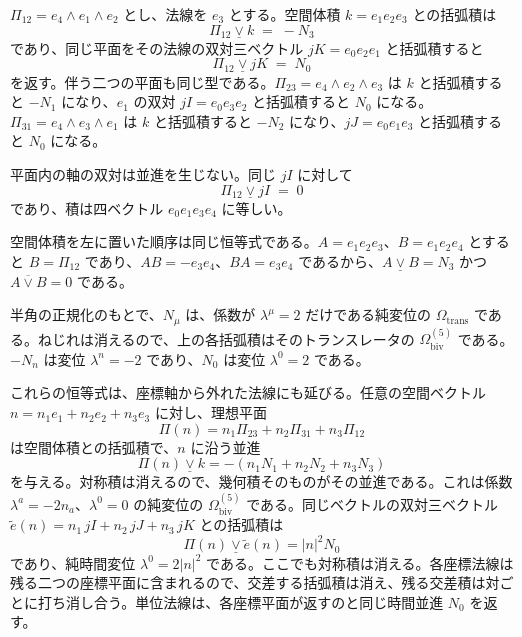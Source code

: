 \documentclass[a4paper]{article}
\begin{document}
\(\Pi_{12}=e_{4}\wedge e_{1}\wedge e_{2}\) とし、法線を \(e_{3}\) とする。空間体積 \(k=e_{1}e_{2}e_{3}\) との括弧積は
\[
\Pi_{12}\mathbin{\underline{\vee}} k \;=\; -N_{3}
\]
であり、同じ平面をその法線の双対三ベクトル \(jK=e_{0}e_{2}e_{1}\) と括弧積すると
\[
\Pi_{12}\mathbin{\underline{\vee}} jK \;=\; N_{0}
\]
を返す。伴う二つの平面も同じ型である。\(\Pi_{23}=e_{4}\wedge e_{2}\wedge e_{3}\) は \(k\) と括弧積すると \(-N_{1}\) になり、\(e_{1}\) の双対 \(jI=e_{0}e_{3}e_{2}\) と括弧積すると \(N_{0}\) になる。\(\Pi_{31}=e_{4}\wedge e_{3}\wedge e_{1}\) は \(k\) と括弧積すると \(-N_{2}\) になり、\(jJ=e_{0}e_{1}e_{3}\) と括弧積すると \(N_{0}\) になる。

平面内の軸の双対は並進を生じない。同じ \(jI\) に対して
\[
\Pi_{12}\mathbin{\underline{\vee}} jI \;=\; 0
\]
であり、積は四ベクトル \(e_{0}e_{1}e_{3}e_{4}\) に等しい。

空間体積を左に置いた順序は同じ恒等式である。\(A=e_{1}e_{2}e_{3}\)、\(B=e_{1}e_{2}e_{4}\) とすると \(B=\Pi_{12}\) であり、\(AB=-e_{3}e_{4}\)、\(BA=e_{3}e_{4}\) であるから、\(A\mathbin{\underline{\vee}}B=N_{3}\) かつ \(A\mathbin{\overline{\vee}}B=0\) である。

半角の正規化のもとで、\(N_{\mu}\) は、係数が \(\lambda^{\mu}=2\) だけである純変位の \(\Omega_{\mathrm{trans}}\) である。ねじれは消えるので、上の各括弧積はそのトランスレータの \(\Omega_{\mathrm{biv}}^{(5)}\) である。\(-N_{n}\) は変位 \(\lambda^{n}=-2\) であり、\(N_{0}\) は変位 \(\lambda^{0}=2\) である。

これらの恒等式は、座標軸から外れた法線にも延びる。任意の空間ベクトル \(n=n_{1}e_{1}+n_{2}e_{2}+n_{3}e_{3}\) に対し、理想平面
\begin{equation}
\label{eq:plane-off-axis}
\Pi(n)=n_{1}\Pi_{23}+n_{2}\Pi_{31}+n_{3}\Pi_{12}
\end{equation}
は空間体積との括弧積で、\(n\) に沿う並進
\begin{equation}
\label{eq:vee-off-axis}
\Pi(n)\mathbin{\underline{\vee}} k=-(n_{1}N_{1}+n_{2}N_{2}+n_{3}N_{3})
\end{equation}
を与える。対称積は消えるので、幾何積そのものがその並進である。これは係数 \(\lambda^{a}=-2n_{a}\)、\(\lambda^{0}=0\) の純変位の \(\Omega_{\mathrm{biv}}^{(5)}\) である。同じベクトルの双対三ベクトル \(\tilde{e}(n)=n_{1}\,jI+n_{2}\,jJ+n_{3}\,jK\) との括弧積は
\begin{equation}
\label{eq:vee-dual-off-axis}
\Pi(n)\mathbin{\underline{\vee}}\tilde{e}(n)=|n|^{2}N_{0}
\end{equation}
であり、純時間変位 \(\lambda^{0}=2|n|^{2}\) である。ここでも対称積は消える。各座標法線は残る二つの座標平面に含まれるので、交差する括弧積は消え、残る交差積は対ごとに打ち消し合う。単位法線は、各座標平面が返すのと同じ時間並進 \(N_{0}\) を返す。
\end{document}
